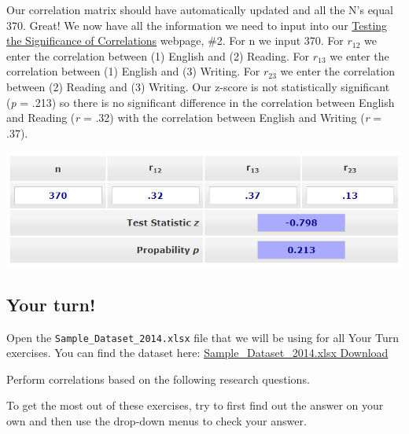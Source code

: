 \documentclass[
]{book}
\begin{document}
Our correlation matrix should have automatically updated and all the N's equal 370. Great! We now have all the information we need to input into our \href{https://www.psychometrica.de/correlation.html}{Testing the Significance of Correlations} webpage, \#2. For n we input 370. For \(r_{12}\) we enter the correlation between (1) English and (2) Reading. For \(r_{13}\) we enter the correlation between (1) English and (3) Writing. For \(r_{23}\) we enter the correlation between (2) Reading and (3) Writing. Our z-score is not statistically significant (\emph{p} = .213) so there is no significant difference in the correlation between English and Reading (\emph{r} = .32) with the correlation between English and Writing (\emph{r} = .37).

\includegraphics{images/08-correlation/compare-correlations-dependent.png}

\hypertarget{your-turn-8}{%
\subsection{Your turn!}\label{your-turn-8}}

Open the \texttt{Sample\_Dataset\_2014.xlsx} file that we will be using for all Your Turn exercises. You can find the dataset here: \href{https://github.com/danawanzer/stats-with-jamovi/blob/master/data/Sample_Dataset_2014.xlsx}{Sample\_Dataset\_2014.xlsx Download}

Perform correlations based on the following research questions.

To get the most out of these exercises, try to first find out the answer on your own and then use the drop-down menus to check your answer.
\end{document}
